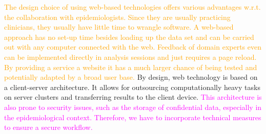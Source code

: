 \documentclass[journal]{style/vgtc} 			          %
\newcommand{\design}[1]{\textcolor{orange}{#1}}
\newcommand{\magenta}[1]{\textcolor{magenta}{#1}}
\begin{document}
\design{
The design choice of using web-based technologies offers various advantages w.r.t. the collaboration with epidemiologists.
Since they are usually practicing clinicians, they usually have little time to wrangle software.
A web-based approach has no set-up time besides loading up the data set and can be carried out with any computer connected with the web.
Feedback of domain experts even can be implemented directly in analysis sessions and just requires a page reload.
By providing a service a website it has a much larger chance of being tested and potentially adapted by a broad user base.
}
By design, web technology is based on a client-server architecture.
It allows for outsourcing computationally heavy tasks on server clusters and transferring results to the client device.
\magenta{
This architecture is also prone to security issues, such as the storage of confidential data, especially in the epidemiological context.
Therefore, we have to incorporate technical measures to ensure a secure workflow.
}
\end{document}
